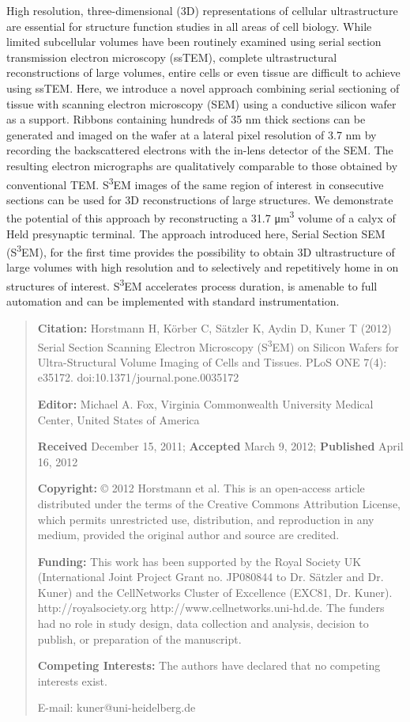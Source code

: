 \documentclass{article}
\begin{document}
High resolution, three-dimensional (3D) representations of cellular ultrastructure are essential for structure function studies in all areas of cell biology. While limited subcellular volumes have been routinely examined using serial section transmission electron microscopy (ssTEM), complete ultrastructural reconstructions of large volumes, entire cells or even tissue are difficult to achieve using ssTEM. Here, we introduce a novel approach combining serial sectioning of tissue with scanning electron microscopy (SEM) using a conductive silicon wafer as a support. Ribbons containing hundreds of 35 nm thick sections can be generated and imaged on the wafer at a lateral pixel resolution of 3.7 nm by recording the backscattered electrons with the in-lens detector of the SEM. The resulting electron micrographs are qualitatively comparable to those obtained by conventional TEM. S\textsuperscript{3}EM images of the same region of interest in consecutive sections can be used for 3D reconstructions of large structures. We demonstrate the potential of this approach by reconstructing a 31.7 μm\textsuperscript{3} volume of a calyx of Held presynaptic terminal. The approach introduced here, Serial Section SEM (S\textsuperscript{3}EM), for the first time provides the possibility to obtain 3D ultrastructure of large volumes with high resolution and to selectively and repetitively home in on structures of interest. S\textsuperscript{3}EM accelerates process duration, is amenable to full automation and can be implemented with standard instrumentation.

\begin{quote}\small
\noindent\textbf{Citation:} Horstmann H, Körber C, Sätzler K, Aydin D, Kuner T (2012) Serial Section Scanning Electron Microscopy (S\textsuperscript{3}EM) on Silicon Wafers for Ultra-Structural Volume Imaging of Cells and Tissues. PLoS ONE 7(4): e35172. doi:10.1371/journal.pone.0035172

\noindent\textbf{Editor:} Michael A. Fox, Virginia Commonwealth University Medical Center, United States of America

\noindent\textbf{Received} December 15, 2011; \textbf{Accepted} March 9, 2012; \textbf{Published} April 16, 2012

\noindent\textbf{Copyright:} © 2012 Horstmann et al. This is an open-access article distributed under the terms of the Creative Commons Attribution License, which permits unrestricted use, distribution, and reproduction in any medium, provided the original author and source are credited.

\noindent\textbf{Funding:} This work has been supported by the Royal Society UK (International Joint Project Grant no. JP080844 to Dr. Sätzler and Dr. Kuner) and the CellNetworks Cluster of Excellence (EXC81, Dr. Kuner). http://royalsociety.org http://www.cellnetworks.uni-hd.de. The funders had no role in study design, data collection and analysis, decision to publish, or preparation of the manuscript.

\noindent\textbf{Competing Interests:} The authors have declared that no competing interests exist.

\noindent * E-mail: kuner@uni-heidelberg.de
\end{quote}
\end{document}
